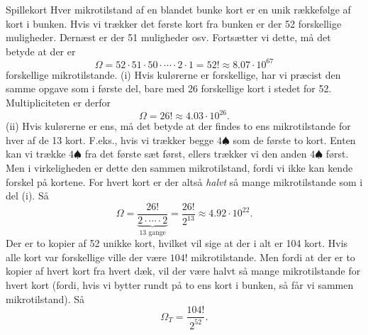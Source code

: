 \begin{opgave}{Spillekort}
    \opg Hver mikrotilstand af en blandet bunke kort er en unik rækkefølge af kort i bunken. Hvis vi trækker det første kort fra bunken er der 52 forskellige muligheder. Dernæst er der 51 muligheder osv. Fortsætter vi dette, må det betyde at der er 
    \[ \Omega=52\cdot 51\cdot 50\cdot \cdots\cdot 2\cdot 1=52!\approx 8.07\cdot 10^{67} \]
    forskellige mikrotilstande.
    \opg (i) Hvis kulørerne er forskellige, har vi præcist den samme opgave som i første del, bare med 26 forskellige kort i stedet for 52. Multipliciteten er derfor
    \[ \Omega=26!\approx 4.03\cdot 10^{26}. \]
    (ii) Hvis kulørerne er ens, må det betyde at der findes to ens mikrotilstande for hver af de 13 kort. F.eks., hvis vi trækker begge $4\spadesuit$ som de første to kort. Enten kan vi trække $4\spadesuit$ fra det første sæt først, ellers trækker vi den anden $4\spadesuit$ først. Men i virkeligheden er dette den sammen mikrotilstand, fordi vi ikke kan kende forskel på kortene. For hvert kort er der altså \emph{halvt} så mange mikrotilstande som i del (i). Så
    \[ \Omega=\underbrace{\frac{26!}{2\cdot\cdots\cdot 2}}_{\text{13 gange}}=\frac{26!}{2^{13}}\approx 4.92\cdot 10^{22}. \]
    \opg Der er to kopier af 52 unikke kort, hvilket vil sige at der i alt er 104 kort. Hvis alle kort var forskellige ville der være $104!$ mikrotilstande. Men fordi at der er to kopier af hvert kort fra hvert dæk, vil der være halvt så mange mikrotilstande for hvert kort (fordi, hvis vi bytter rundt på to ens kort i bunken, så får vi sammen mikrotilstand). Så
    \[ \Omega_T=\frac{104!}{2^{52}}. \]
\end{opgave}

